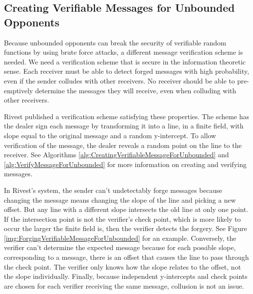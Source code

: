 \documentclass{dalcsthesis}
\begin{document}
\subsection{Creating Verifiable Messages for Unbounded Opponents}
\label{sec:vermes}

Because unbounded opponents can break the security of verifiable random functions by using brute force attacks, a different message verification scheme is needed. We need a verification scheme that is secure in the information theoretic sense. Each receiver must be able to detect forged messages with high probability, even if the sender colludes with other receivers. No receiver should be able to pre-emptively determine the messages they will receive, even when colluding with other receivers.

Rivest \cite{rivest99} published a verification scheme satisfying these properties. The scheme has the dealer sign each message by transforming it into a line, in a finite field, with slope equal to the original message and a random y-intercept. To allow verification of the message, the dealer reveals a random point on the line to the receiver. See Algorithms \ref{alg:CreatingVerifiableMessageForUnbounded} and \ref{alg:VerifyMessageForUnbounded} for more information on creating and verifying messages.

In Rivest's system, the sender can't undetectably forge messages because changing the message means changing the slope of the line and picking a new offset. But any line with a different slope intersects the old line at only one point. If the intersection point is not the verifier's check point, which is more likely to occur the larger the finite field is, then the verifier detects the forgery. See Figure \ref{img:ForgingVerifiableMessageForUnbounded} for an example. Conversely, the verifier can't determine the expected message because for each possible slope, corresponding to a message, there is an offset that causes the line to pass through the check point. The verifier only knows how the slope relates to the offset, not the slope individually. Finally, because independent y-intercepts and check points are chosen for each verifier receiving the same message, collusion is not an issue.
\end{document}
